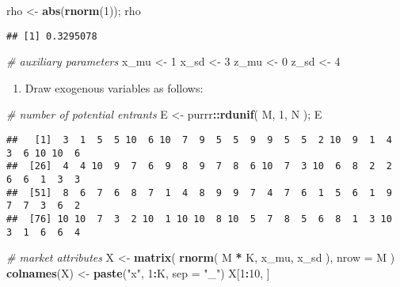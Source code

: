 \documentclass[
]{book}
\newenvironment{Shaded}{\begin{snugshade}}{\end{snugshade}}
\newcommand{\AttributeTok}[1]{\textcolor[rgb]{0.13,0.29,0.53}{#1}}
\newcommand{\CommentTok}[1]{\textcolor[rgb]{0.56,0.35,0.01}{\textit{#1}}}
\newcommand{\DecValTok}[1]{\textcolor[rgb]{0.00,0.00,0.81}{#1}}
\newcommand{\FunctionTok}[1]{\textcolor[rgb]{0.13,0.29,0.53}{\textbf{#1}}}
\newcommand{\NormalTok}[1]{#1}
\newcommand{\OtherTok}[1]{\textcolor[rgb]{0.56,0.35,0.01}{#1}}
\newcommand{\SpecialCharTok}[1]{\textcolor[rgb]{0.81,0.36,0.00}{\textbf{#1}}}
\newcommand{\StringTok}[1]{\textcolor[rgb]{0.31,0.60,0.02}{#1}}
\providecommand{\tightlist}{%
  \setlength{\itemsep}{0pt}\setlength{\parskip}{0pt}}
\begin{document}
\begin{Shaded}
\begin{Highlighting}[]
\NormalTok{rho }\OtherTok{\textless{}{-}} \FunctionTok{abs}\NormalTok{(}\FunctionTok{rnorm}\NormalTok{(}\DecValTok{1}\NormalTok{)); }
\NormalTok{rho}
\end{Highlighting}
\end{Shaded}

\begin{verbatim}
## [1] 0.3295078
\end{verbatim}

\begin{Shaded}
\begin{Highlighting}[]
\CommentTok{\# auxiliary parameters}
\NormalTok{x\_mu }\OtherTok{\textless{}{-}} \DecValTok{1}
\NormalTok{x\_sd }\OtherTok{\textless{}{-}} \DecValTok{3}
\NormalTok{z\_mu }\OtherTok{\textless{}{-}} \DecValTok{0}
\NormalTok{z\_sd }\OtherTok{\textless{}{-}} \DecValTok{4}
\end{Highlighting}
\end{Shaded}

\begin{enumerate}
\def\labelenumi{\arabic{enumi}.}
\setcounter{enumi}{2}
\tightlist
\item
  Draw exogenous variables as follows:
\end{enumerate}

\begin{Shaded}
\begin{Highlighting}[]
\CommentTok{\# number of potential entrants}
\NormalTok{E }\OtherTok{\textless{}{-}} 
\NormalTok{  purrr}\SpecialCharTok{::}\FunctionTok{rdunif}\NormalTok{(}
\NormalTok{    M, }
    \DecValTok{1}\NormalTok{, }
\NormalTok{    N}
\NormalTok{    ); }
\NormalTok{E}
\end{Highlighting}
\end{Shaded}

\begin{verbatim}
##   [1]  3  1  5  5 10  6 10  7  9  5  5  9  9  5  5  2 10  9  1  4  3  6 10 10  6
##  [26]  4  4 10  9  7  6  9  8  9  7  8  6 10  7  3 10  6  8  2  2  6  6  1  3  3
##  [51]  8  6  7  6  8  7  1  4  8  9  9  7  4  7  6  1  5  6  1  9  7  7  3  6  2
##  [76] 10 10  7  3  2 10  1 10 10  8 10  5  7  8  5  6  8  1  3 10  3  1  6  6  4
\end{verbatim}

\begin{Shaded}
\begin{Highlighting}[]
\CommentTok{\# market attributes}
\NormalTok{X }\OtherTok{\textless{}{-}} 
  \FunctionTok{matrix}\NormalTok{(}
  \FunctionTok{rnorm}\NormalTok{(}
\NormalTok{    M }\SpecialCharTok{*}\NormalTok{ K, }
\NormalTok{    x\_mu, }
\NormalTok{    x\_sd}
\NormalTok{    ),}
  \AttributeTok{nrow =}\NormalTok{ M}
\NormalTok{  )}
\FunctionTok{colnames}\NormalTok{(X) }\OtherTok{\textless{}{-}} \FunctionTok{paste}\NormalTok{(}\StringTok{"x"}\NormalTok{, }\DecValTok{1}\SpecialCharTok{:}\NormalTok{K, }\AttributeTok{sep =} \StringTok{"\_"}\NormalTok{)}
\NormalTok{X[}\DecValTok{1}\SpecialCharTok{:}\DecValTok{10}\NormalTok{, ]}
\end{Highlighting}
\end{Shaded}
\end{document}
